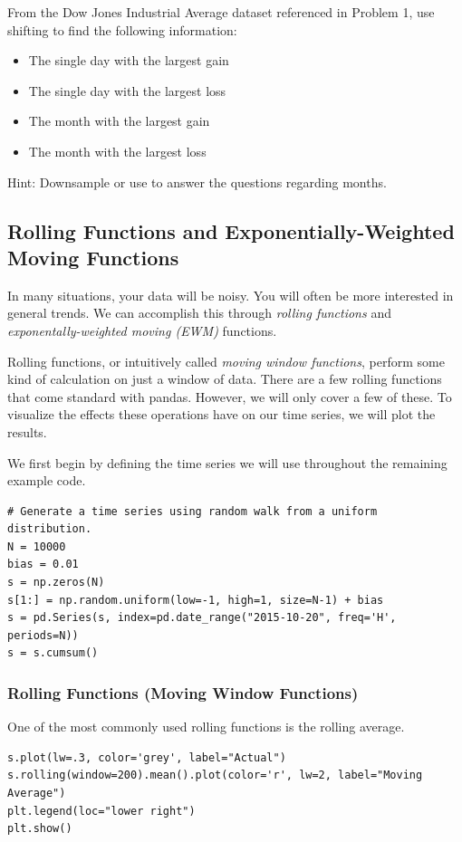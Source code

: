 \begin{problem}
From the Dow Jones Industrial Average dataset referenced in Problem 1, use shifting to find the following information:
    \begin{itemize}
        \item The single day with the largest gain
        \item The single day with the largest loss
        \item The month with the largest gain
        \item The month with the largest loss
    \end{itemize}
Hint: Downsample or use  to answer the questions regarding months.
\end{problem}

\subsection*{Rolling Functions and Exponentially-Weighted Moving Functions}

In many situations, your data will be noisy. You will often be more interested in general trends. We can accomplish this through \emph{rolling functions} and \emph{exponentally-weighted moving (EWM)} functions.

Rolling functions, or intuitively called \emph{moving window functions}, perform some kind of calculation on just a window of data. There are a few rolling functions that come standard with pandas. However, we will only cover a few of these. To visualize the effects these operations have on our time series, we will plot the results.

We first begin by defining the time series we will use throughout the remaining example code.
\begin{lstlisting}
# Generate a time series using random walk from a uniform distribution.
N = 10000
bias = 0.01
s = np.zeros(N)
s[1:] = np.random.uniform(low=-1, high=1, size=N-1) + bias
s = pd.Series(s, index=pd.date_range("2015-10-20", freq='H', periods=N))
s = s.cumsum()
\end{lstlisting}

\subsubsection*{Rolling Functions (Moving Window Functions)}
One of the most commonly used rolling functions is the rolling average.

\begin{lstlisting}
s.plot(lw=.3, color='grey', label="Actual")
s.rolling(window=200).mean().plot(color='r', lw=2, label="Moving Average")
plt.legend(loc="lower right")
plt.show()
\end{lstlisting}

